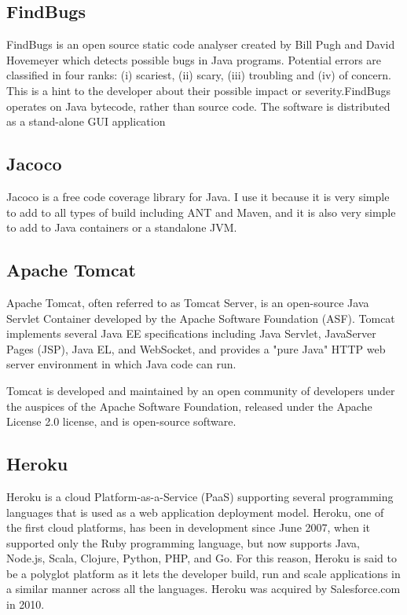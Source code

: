 \documentclass[12pt,a4paper,oneside]{report}
\begin{document}
{\subsection{FindBugs}
\par
FindBugs is an open source static code analyser created by Bill Pugh and David Hovemeyer which detects possible bugs in Java programs. Potential errors are classified in four ranks: (i) scariest, (ii) scary,   (iii) troubling and (iv) of concern. This is a hint to the developer about their possible impact or severity.FindBugs operates on Java bytecode, rather than source code. The software is distributed as a stand-alone GUI application
\subsection{Jacoco}
\par
Jacoco is a free code coverage library for Java. 
I use it because it is very simple to add to all types of build including ANT and Maven, and it is also very simple to add to Java containers or a standalone JVM.
\subsection{Apache Tomcat}
\par
Apache Tomcat, often referred to as Tomcat Server, is an open-source Java Servlet Container developed by the Apache Software Foundation (ASF). Tomcat implements several Java EE specifications including Java Servlet, JavaServer Pages (JSP), Java EL, and WebSocket, and provides a "pure Java" HTTP web server environment in which Java code can run.

Tomcat is developed and maintained by an open community of developers under the auspices of the Apache Software Foundation, released under the Apache License 2.0 license, and is open-source software.
\subsection{Heroku}
\par
Heroku is a cloud Platform-as-a-Service (PaaS) supporting several programming languages that is used as a web application deployment model. Heroku, one of the first cloud platforms, has been in development since June 2007, when it supported only the Ruby programming language, but now supports Java, Node.js, Scala, Clojure, Python, PHP, and Go. For this reason, Heroku is said to be a polyglot platform as it lets the developer build, run and scale applications in a similar manner across all the languages. Heroku was acquired by Salesforce.com in 2010.
}
\end{document}
